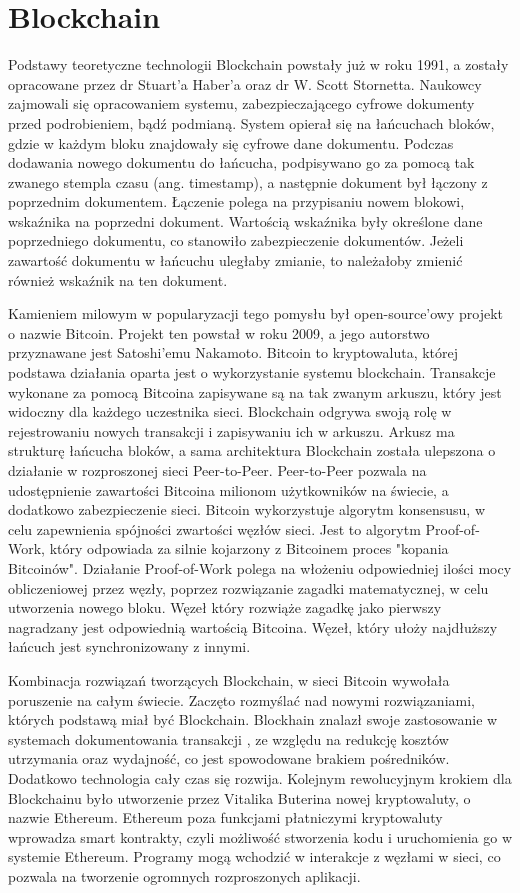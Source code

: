 \documentclass[a4paper,12pt]{book}
\begin{document}
\chapter{Blockchain}
Podstawy teoretyczne technologii Blockchain powstały już w roku 1991, a zostały opracowane przez dr Stuart'a Haber'a oraz dr W. Scott Stornetta. Naukowcy zajmowali się opracowaniem systemu, zabezpieczającego cyfrowe dokumenty przed podrobieniem, bądź podmianą. System opierał się na łańcuchach bloków, gdzie w każdym bloku znajdowały się cyfrowe dane dokumentu. Podczas dodawania nowego dokumentu do łańcucha, podpisywano go za pomocą tak zwanego stempla czasu (ang. timestamp), a następnie dokument był łączony z poprzednim dokumentem. Łączenie polega na przypisaniu nowem blokowi, wskaźnika na poprzedni dokument. Wartością wskaźnika były określone dane poprzedniego dokumentu, co stanowiło zabezpieczenie dokumentów. Jeżeli zawartość dokumentu w łańcuchu uległaby zmianie, to należałoby zmienić również wskaźnik na ten dokument\cite{pa}.

Kamieniem milowym w popularyzacji tego pomysłu był open-source'owy projekt o nazwie Bitcoin. Projekt ten powstał w roku 2009, a jego autorstwo przyznawane jest Satoshi'emu Nakamoto. Bitcoin to kryptowaluta, której podstawa działania oparta jest o wykorzystanie systemu blockchain. Transakcje wykonane za pomocą Bitcoina zapisywane są na tak zwanym arkuszu, który jest widoczny dla każdego uczestnika sieci. Blockchain odgrywa swoją rolę w rejestrowaniu nowych transakcji i zapisywaniu ich w arkuszu. Arkusz ma strukturę łańcucha bloków, a sama architektura Blockchain została ulepszona o działanie w rozproszonej sieci Peer-to-Peer. Peer-to-Peer pozwala na udostępnienie zawartości Bitcoina milionom użytkowników na świecie, a dodatkowo zabezpieczenie sieci. Bitcoin wykorzystuje algorytm konsensusu, w celu zapewnienia spójności zwartości węzłów sieci. Jest to algorytm Proof-of-Work, który odpowiada za silnie kojarzony z Bitcoinem proces "kopania Bitcoinów".
Działanie Proof-of-Work polega na włożeniu odpowiedniej ilości mocy obliczeniowej przez węzły, poprzez rozwiązanie zagadki matematycznej, w celu utworzenia nowego bloku. Węzeł który rozwiąże zagadkę jako pierwszy nagradzany jest odpowiednią wartością Bitcoina. Węzeł, który ułoży najdłuższy łańcuch jest synchronizowany z innymi\cite{bitcoin}.

Kombinacja rozwiązań tworzących Blockchain, w sieci Bitcoin wywołała poruszenie na całym świecie. Zaczęto rozmyślać nad nowymi rozwiązaniami, których podstawą miał być Blockchain. Blockhain znalazł swoje zastosowanie w systemach dokumentowania transakcji , ze względu na redukcję kosztów utrzymania oraz wydajność, co jest spowodowane\cite{business} brakiem pośredników. Dodatkowo technologia cały czas się rozwija. Kolejnym rewolucyjnym krokiem dla Blockchainu było utworzenie przez Vitalika Buterina nowej kryptowaluty, o nazwie Ethereum. Ethereum poza funkcjami płatniczymi kryptowaluty wprowadza smart kontrakty, czyli możliwość stworzenia kodu i uruchomienia go w systemie Ethereum. Programy mogą wchodzić w interakcje z węzłami w sieci, co pozwala na tworzenie ogromnych rozproszonych aplikacji.
\end{document}

